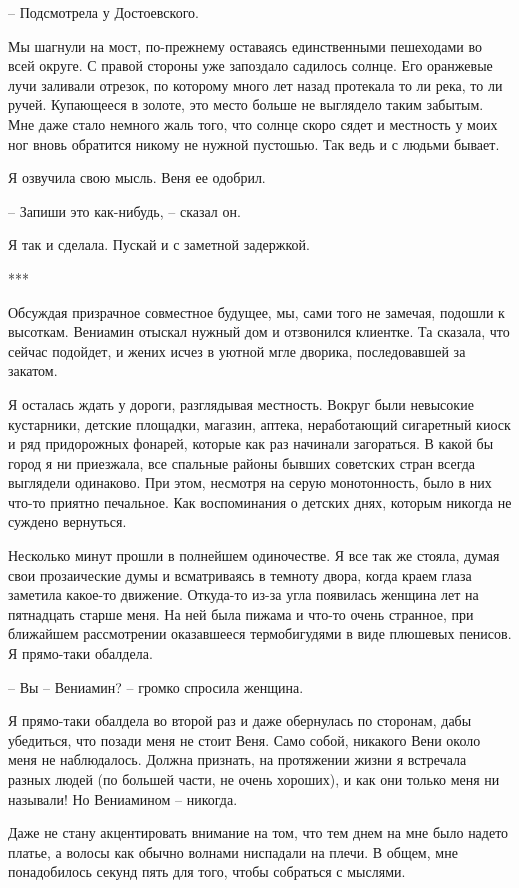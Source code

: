 \documentclass[
]{book}
\begin{document}
-- Подсмотрела у Достоевского.

Мы шагнули на мост, по-прежнему оставаясь единственными пешеходами во всей округе. С правой стороны уже запоздало садилось солнце. Его оранжевые лучи заливали отрезок, по которому много лет назад протекала то ли река, то ли ручей. Купающееся в золоте, это место больше не выглядело таким забытым. Мне даже стало немного жаль того, что солнце скоро сядет и местность у моих ног вновь обратится никому не нужной пустошью. Так ведь и с людьми бывает.

Я озвучила свою мысль. Веня ее одобрил.

-- Запиши это как-нибудь, -- сказал он.

Я так и сделала. Пускай и с заметной задержкой.

***

Обсуждая призрачное совместное будущее, мы, сами того не замечая, подошли к высоткам. Вениамин отыскал нужный дом и отзвонился клиентке. Та сказала, что сейчас подойдет, и жених исчез в уютной мгле дворика, последовавшей за закатом.

Я осталась ждать у дороги, разглядывая местность. Вокруг были невысокие кустарники, детские площадки, магазин, аптека, неработающий сигаретный киоск и ряд придорожных фонарей, которые как раз начинали загораться. В какой бы город я ни приезжала, все спальные районы бывших советских стран всегда выглядели одинаково. При этом, несмотря на серую монотонность, было в них что-то приятно печальное. Как воспоминания о детских днях, которым никогда не суждено вернуться.

Несколько минут прошли в полнейшем одиночестве. Я все так же стояла, думая свои прозаические думы и всматриваясь в темноту двора, когда краем глаза заметила какое-то движение. Откуда-то из-за угла появилась женщина лет на пятнадцать старше меня. На ней была пижама и что-то очень странное, при ближайшем рассмотрении оказавшееся термобигудями в виде плюшевых пенисов. Я прямо-таки обалдела.

-- Вы -- Вениамин? -- громко спросила женщина.

Я прямо-таки обалдела во второй раз и даже обернулась по сторонам, дабы убедиться, что позади меня не стоит Веня. Само собой, никакого Вени около меня не наблюдалось. Должна признать, на протяжении жизни я встречала разных людей (по большей части, не очень хороших), и как они только меня ни называли! Но Вениамином -- никогда.

Даже не стану акцентировать внимание на том, что тем днем на мне было надето платье, а волосы как обычно волнами ниспадали на плечи. В общем, мне понадобилось секунд пять для того, чтобы собраться с мыслями.
\end{document}
